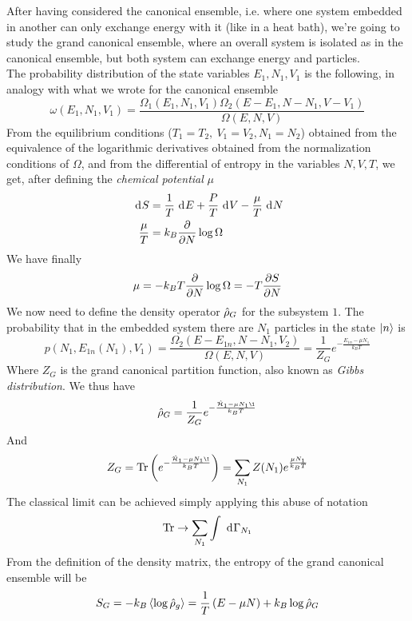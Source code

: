 \documentclass[../qm.tex]{subfiles}
\begin{document}
	After having considered the canonical ensemble, i.e. where one system embedded in another can only exchange energy with it (like in a heat bath), we're going to study the grand canonical ensemble, where an overall system is isolated as in the canonical ensemble, but both system can exchange energy and particles.\\
	The probability distribution of the state variables $E_1,N_1,V_1$ is the following, in analogy with what we wrote for the canonical ensemble
	\begin{equation}
		\omega(E_1,N_1,V_1)=\frac{\Omega_1(E_1,N_1,V_1)\Omega_2(E-E_1,N-N_1,V-V_1)}{\Omega(E,N,V)}
		\label{eq:pdfgc}
	\end{equation}
	From the equilibrium conditions ($T_1=T_2,\ V_1=V_2, N_1=N_2$) obtained from the equivalence of the logarithmic derivatives obtained from the normalization conditions of $\Omega$, and from the differential of entropy in the variables $N,V,T$, we get, after defining the \textit{chemical potential} $\mu$
	\begin{equation*}
		\begin{aligned}
			\ \mathrm{d}^{}S&=\frac{1}{T}\ \mathrm{d}^{}E+\frac{P}{T}\ \mathrm{d}^{}V-\frac{\mu}{T}\ \mathrm{d}^{}N\\
			\frac{\mu}{T}&=k_B\pdv{N}\log\Omega
		\end{aligned}
	\end{equation*}
	We have finally
	\begin{equation}
		\mu=-k_BT\pdv{N}\log\Omega=-T\pdv{S}{N}
		\label{eq:chemicalpotential}
	\end{equation}
	We now need to define the density operator $\hat{\rho}_{G}$ for the subsystem $1$. The probability that in the embedded system there are $N_1$ particles in the state $\ket{n}$ is
	\begin{equation}
		p(N_1,E_{1n}(N_1),V_1)=\frac{\Omega_2(E-E_{1n},N-N_1,V_2)}{\Omega(E,N,V)}=\frac{1}{Z_G}e^{-\frac{E_{1n}-\mu N_1}{k_BT}}
		\label{eq:grandcanon}
	\end{equation}
	Where $Z_G$ is the grand canonical partition function, also known as \textit{Gibbs distribution}. We thus have
	\begin{equation}
		\dopr_G=\frac{1}{Z_G}e^{-\frac{\opr{\ham}_1-\mu N_1\1}{k_BT}}
		\label{eq:grandcanonrho}
	\end{equation}
	And
	\begin{equation}
		Z_G=\trace\left( e^{-\frac{\opr{\ham}_1 -\mu N_1\1}{k_BT}} \right)=\sum_{N_1}Z(N_1)e^{\frac{\mu N_1}{k_BT}}
		\label{eq:grandcanonpartition}
	\end{equation}
	The classical limit can be achieved simply applying this abuse of notation
	\begin{equation*}
		\mathrm{Tr}\to\sum_{N_1}\int\ \mathrm{d}^{}\Gamma_{N_1}
	\end{equation*}
	From the definition of the density matrix, the entropy of the grand canonical ensemble will be
	\begin{equation}
		S_G=-k_B\expval{\log\hat{\rho}_g}=\frac{1}{T}\left( E-\mu N \right)+k_B\log\hat{\rho}_G
		\label{eq:gcentropy}
	\end{equation}
\end{document}
